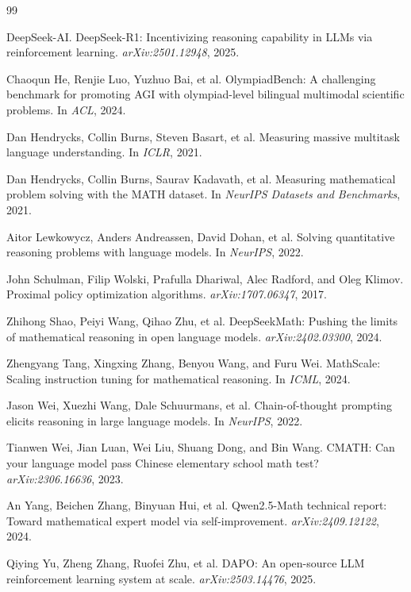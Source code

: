 \documentclass[11pt,a4paper]{article}
\begin{document}

\begin{thebibliography}{99}

DeepSeek-AI. DeepSeek-R1: Incentivizing reasoning capability in LLMs via
reinforcement learning. \emph{arXiv:2501.12948}, 2025.

Chaoqun He, Renjie Luo, Yuzhuo Bai, et al. OlympiadBench: A challenging benchmark for
promoting AGI with olympiad-level bilingual multimodal scientific problems. In
\emph{ACL}, 2024.

Dan Hendrycks, Collin Burns, Steven Basart, et al. Measuring massive multitask
language understanding. In \emph{ICLR}, 2021.

Dan Hendrycks, Collin Burns, Saurav Kadavath, et al. Measuring mathematical problem
solving with the MATH dataset. In \emph{NeurIPS Datasets and Benchmarks}, 2021.

Aitor Lewkowycz, Anders Andreassen, David Dohan, et al. Solving quantitative
reasoning problems with language models. In \emph{NeurIPS}, 2022.

John Schulman, Filip Wolski, Prafulla Dhariwal, Alec Radford, and Oleg Klimov.
Proximal policy optimization algorithms. \emph{arXiv:1707.06347}, 2017.

Zhihong Shao, Peiyi Wang, Qihao Zhu, et al. DeepSeekMath: Pushing the limits of
mathematical reasoning in open language models. \emph{arXiv:2402.03300}, 2024.

Zhengyang Tang, Xingxing Zhang, Benyou Wang, and Furu Wei. MathScale: Scaling
instruction tuning for mathematical reasoning. In \emph{ICML}, 2024.

Jason Wei, Xuezhi Wang, Dale Schuurmans, et al. Chain-of-thought prompting elicits
reasoning in large language models. In \emph{NeurIPS}, 2022.

Tianwen Wei, Jian Luan, Wei Liu, Shuang Dong, and Bin Wang. CMATH: Can your language
model pass Chinese elementary school math test? \emph{arXiv:2306.16636}, 2023.

An Yang, Beichen Zhang, Binyuan Hui, et al. Qwen2.5-Math technical report: Toward
mathematical expert model via self-improvement. \emph{arXiv:2409.12122}, 2024.

Qiying Yu, Zheng Zhang, Ruofei Zhu, et al. DAPO: An open-source LLM reinforcement
learning system at scale. \emph{arXiv:2503.14476}, 2025.

\end{thebibliography}
\end{document}
